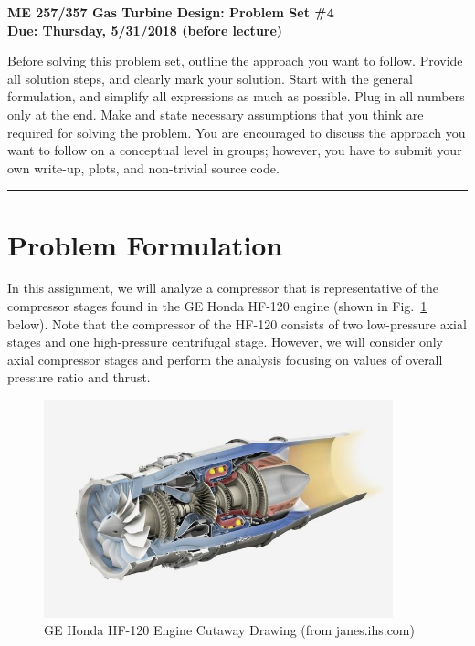 \documentclass[11pt]{article}
\def\hwnum{4}
\begin{document}
\begin{center}
{\Large\bf ME 257/357 Gas Turbine Design: Problem Set \#\hwnum\\
       Due: Thursday, 5/31/2018 (before lecture)}
\end{center}

Before solving this problem set, outline the approach you want to follow. Provide all solution steps, and clearly mark your solution. Start with the general formulation, and simplify all expressions as much as possible. Plug in all numbers only at the end. Make and state necessary assumptions that you
think are required for solving the problem. You are encouraged to discuss the approach you want to follow on a conceptual level in groups; however, you have to submit your own write-up, plots, and non-trivial source code.
\\
\hrule
\vspace{2mm}
\noindent

\section*{Problem Formulation}

  In this assignment, we will analyze a compressor that is representative of the compressor stages found in the GE Honda HF-120 engine (shown in Fig.~\ref{FIG_CUTAWAY} below). Note that the compressor of the HF-120 consists of two low-pressure axial stages and one high-pressure centrifugal stage. However, we will consider only axial compressor stages and perform the analysis focusing on values of overall pressure ratio and thrust.

  \begin{figure}[!ht!]
      \begin{center}
          \includegraphics[width=0.9\textwidth]{GE_Honda_HF-120_Cutaway.jpg}
          \caption{\label{FIG_CUTAWAY} GE Honda HF-120 Engine Cutaway Drawing (from janes.ihs.com)}
      \end{center}
  \end{figure}
\end{document}
